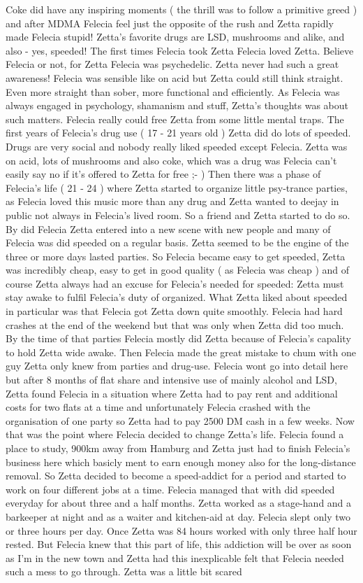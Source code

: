\documentclass[12pt]{book}
\begin{document}
Coke did have any inspiring moments ( the thrill was to follow a primitive greed ) and after MDMA Felecia feel just the opposite of the rush and Zetta rapidly made Felecia stupid! Zetta's favorite drugs are LSD, mushrooms and alike, and also - yes, speeded! The first times Felecia took Zetta Felecia loved Zetta. Believe Felecia or not, for Zetta Felecia was psychedelic. Zetta never had such a great awareness! Felecia was sensible like on acid but Zetta could still think straight. Even more straight than sober, more functional and efficiently. As Felecia was always engaged in psychology, shamanism and stuff, Zetta's thoughts was about such matters. Felecia really could free Zetta from some little mental traps. The first years of Felecia's drug use ( 17 - 21 years old ) Zetta did do lots of speeded. Drugs are very social and nobody really liked speeded except Felecia. Zetta was on acid, lots of mushrooms and also coke, which was a drug was Felecia can't easily say no if it's offered to Zetta for free ;- ) Then there was a phase of Felecia's life ( 21 - 24 ) where Zetta started to organize little psy-trance parties, as Felecia loved this music more than any drug and Zetta wanted to deejay in public not always in Felecia's lived room. So a friend and Zetta started to do so. By did Felecia Zetta entered into a new scene with new people and many of Felecia was did speeded on a regular basis. Zetta seemed to be the engine of the three or more days lasted parties. So Felecia became easy to get speeded, Zetta was incredibly cheap, easy to get in good quality ( as Felecia was cheap ) and of course Zetta always had an excuse for Felecia's needed for speeded: Zetta must stay awake to fulfil Felecia's duty of organized. What Zetta liked about speeded in particular was that Felecia got Zetta down quite smoothly. Felecia had hard crashes at the end of the weekend but that was only when Zetta did too much. By the time of that parties Felecia mostly did Zetta because of Felecia's capality to hold Zetta wide awake. Then Felecia made the great mistake to chum with one guy Zetta only knew from parties and drug-use. Felecia wont go into detail here but after 8 months of flat share and intensive use of mainly alcohol and LSD, Zetta found Felecia in a situation where Zetta had to pay rent and additional costs for two flats at a time and unfortunately Felecia crashed with the organisation of one party so Zetta had to pay 2500 DM cash in a few weeks. Now that was the point where Felecia decided to change Zetta's life. Felecia found a place to study, 900km away from Hamburg and Zetta just had to finish Felecia's business here which basicly ment to earn enough money also for the long-distance removal. So Zetta decided to become a speed-addict for a period and started to work on four different jobs at a time. Felecia managed that with did speeded everyday for about three and a half months. Zetta worked as a stage-hand and a barkeeper at night and as a waiter and kitchen-aid at day. Felecia slept only two or three hours per day. Once Zetta was 84 hours worked with only three half hour rested. But Felecia knew that this part of life, this addiction will be over as soon as I'm in the new town and Zetta had this inexplicable felt that Felecia needed such a mess to go through. Zetta was a little bit scared 
\end{document}

